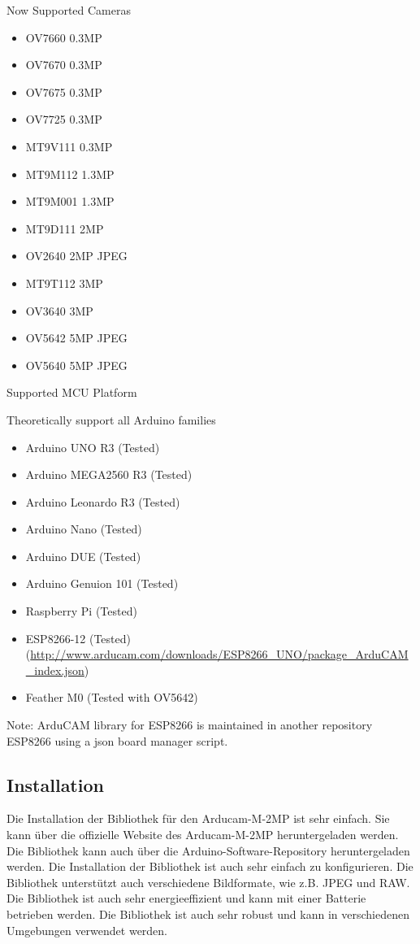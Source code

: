 \bigskip

Now Supported Cameras

\begin{itemize}
    \item OV7660 0.3MP
    \item OV7670 0.3MP
    \item OV7675 0.3MP
    \item OV7725 0.3MP
    \item MT9V111 0.3MP
    \item MT9M112 1.3MP
    \item MT9M001 1.3MP
    \item MT9D111 2MP
    \item OV2640 2MP JPEG
    \item MT9T112 3MP
    \item OV3640 3MP
    \item OV5642 5MP JPEG
    \item OV5640 5MP JPEG
\end{itemize}

Supported MCU Platform

Theoretically support all Arduino families

\begin{itemize}
    \item Arduino UNO R3 (Tested)
    \item Arduino MEGA2560 R3 (Tested)
    \item Arduino Leonardo R3 (Tested)
    \item Arduino Nano (Tested)
    \item Arduino DUE (Tested)
    \item Arduino Genuion 101 (Tested)
    \item Raspberry Pi (Tested)
    \item ESP8266-12 (Tested) (\url{http://www.arducam.com/downloads/ESP8266_UNO/package_ArduCAM_index.json})
    \item Feather M0 (Tested with OV5642)
\end{itemize}


Note: ArduCAM library for ESP8266 is maintained in another repository ESP8266 using a json board manager script.



\subsection{Installation}

Die Installation der Bibliothek  für den Arducam-M-2MP ist sehr einfach. Sie kann über die offizielle Website des Arducam-M-2MP heruntergeladen werden. Die Bibliothek kann auch über die Arduino-Software-Repository heruntergeladen werden. Die Installation der Bibliothek ist auch sehr einfach zu konfigurieren. Die Bibliothek unterstützt auch verschiedene Bildformate, wie z.B. JPEG und RAW. Die Bibliothek ist auch sehr energieeffizient und kann mit einer Batterie betrieben werden. Die Bibliothek ist auch sehr robust und kann in verschiedenen Umgebungen verwendet werden.

